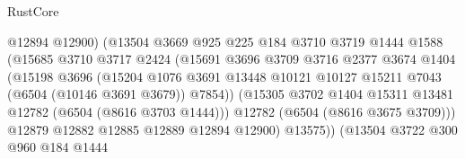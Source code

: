 \begin{lexlean}{RustCore}
\begin{coremodule}
                                    @12894
                                    @12900)
                                  (@13504
                                    @3669
                                    @925
                                    @225
                                    @184
                                    @3710
                                    @3719
                                    @1444
                                    @1588
                                    (@15685
                                      @3710
                                      @3717
                                      @2424
                                      (@15691
                                        @3696
                                        @3709
                                        @3716
                                        @2377
                                        @3674
                                        @1404
                                        (@15198
                                          @3696
                                          (@15204
                                            @1076
                                            @3691
                                            @13448
                                            @10121
                                            @10127
                                            @15211
                                            @7043
                                            (@6504 (@10146 @3691 @3679))
                                            @7854))
                                        (@15305
                                          @3702
                                          @1404
                                          @15311
                                          @13481
                                          @12782
                                          (@6504 (@8616 @3703 @1444)))
                                        @12782
                                        (@6504 (@8616 @3675 @3709)))
                                      @12879
                                      @12882
                                      @12885
                                      @12889
                                      @12894
                                      @12900)
                                    @13575))
                                (@13504
                                  @3722
                                  @300
                                  @960
                                  @184
                                  @1444

\end{coremodule}
\end{lexlean}
